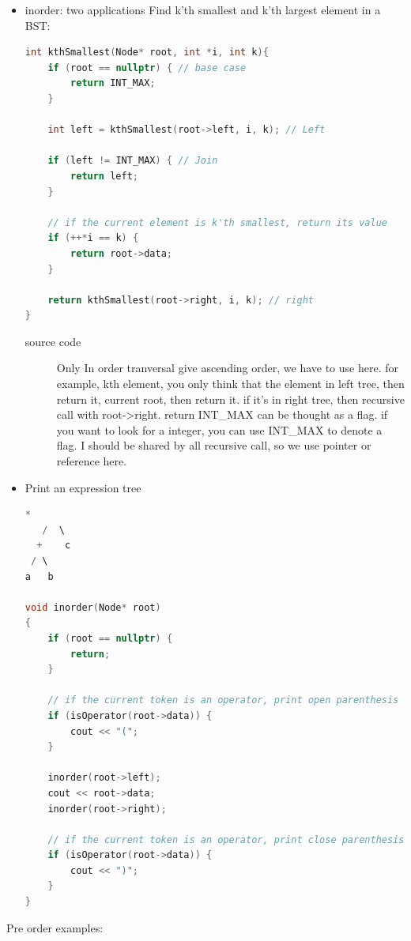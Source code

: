 \documentclass[a4paper,11pt,twoside]{book}
\begin{document}
\begin{itemize}
	
	\item inorder: two applications
	Find k’th smallest and k’th largest element in a BST:
\begin{lstlisting}[frame=single, language=c++]
int kthSmallest(Node* root, int *i, int k){
	if (root == nullptr) { // base case
		return INT_MAX;
	}
	
	int left = kthSmallest(root->left, i, k); // Left 
	
	if (left != INT_MAX) { // Join
		return left;
	}
	
	// if the current element is k'th smallest, return its value
	if (++*i == k) {
		return root->data;
	}
	
	return kthSmallest(root->right, i, k); // right
}
\end{lstlisting}
\begin{description}
	\item[source code] Only In order tranversal give ascending order, we have to use here. for example, kth element, you only think that the element in left tree, then return it, current root, then return it.  if it's in right tree, then recursive call with root->right. return INT\_MAX can be thought as a flag. if you want to look for a integer, you can use INT\_MAX to denote a flag. I should be shared by all recursive call, so we use pointer or reference here. 
\end{description}

	\item Print an expression tree
\begin{lstlisting}[frame=single, language=c++]
     *
   /  \
  +    c
 / \
a   b
	
void inorder(Node* root)
{
	if (root == nullptr) {
		return;
	}
	
	// if the current token is an operator, print open parenthesis
	if (isOperator(root->data)) {
		cout << "(";
	}
	
	inorder(root->left);
	cout << root->data;
	inorder(root->right);
	
	// if the current token is an operator, print close parenthesis
	if (isOperator(root->data)) {
		cout << ")";
	}
}
\end{lstlisting}

\end{itemize}

\par Pre order examples:
\end{document}
